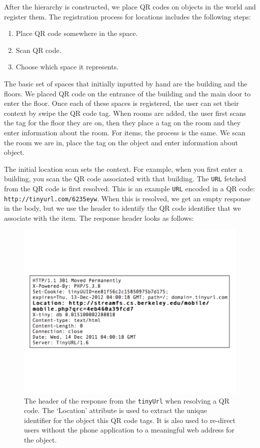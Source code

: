 After the hierarchy is constructed, we place QR codes on objects in the world and register them.  The registration process
for locations includes the following steps:

\begin{enumerate}
\item Place QR code somewhere in the space.
\item Scan QR code.
\item Choose which space it represents.
\end{enumerate}

\vspace{0.04in}

The basic set of spaces that initially inputted by hand are the building and the floors.  We placed QR code on the entrance of the building
and the main door to enter the floor.  Once each of these spaces is registered, the user can set their context by swipe the QR code tag.
When rooms are added, the user first scans the tag for the floor they are on, then they place a tag on the room and they enter information
about the room.  For items, the process is the same.  We scan the room we are in, place the tag on the object and enter information about
object.

The initial location scan sets the context.  For example, when you first enter a building, you scan the QR code associated with that building.
The {\tt URL} fetched from the QR code is first resolved.  This is an example {\tt URL} encoded in a QR code: {\tt http://tinyurl.com/6235eyw}.
When this is resolved, we get an empty response in the body, but we use the header to identify the QR code identifier that we associate
with the item.  The response header looks as follows:

\begin{figure}[htb!]
\begin{center}
\includegraphics[scale=0.3]{figs/tinyurlhdr}
\caption{The header of the response from the {\tt tinyUrl} when resolving a QR code.  The `Location' attribute
is used to extract the unique identifier for the object this QR code tags.  It is also used to re-direct
users without the phone application to a meaningful web address for the object.}
\label{fig:qrcex}
\end{center}
\end{figure}

